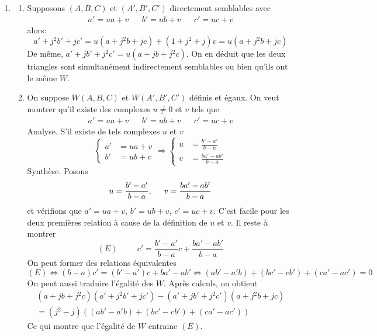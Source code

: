 \begin{enumerate}
 \item 
\begin{enumerate}
 \item Supposons $(A,B,C)$ et $(A',B',C')$ directement semblables avec
\begin{align*}
 a' = ua+v & & b'=ub+v & & c'=uc+v
\end{align*}
alors:
\begin{displaymath}
 a'+j^2b'+jc' = u(a+j^2b+jc) + (1+j^2+j)v = u(a+j^2b+jc)
\end{displaymath}
De même, $a'+jb'+j^2c' = u(a+jb+j^2c)$. On en déduit que les deux triangles sont simultanément indirectement semblables ou bien qu'ils ont le même $W$.
 \item On suppose $W(A,B,C)$ et $W(A',B',C')$ définis et égaux. On veut montrer qu'il existe des complexes $u\neq 0$ et $v$ tels que
\begin{align*}
 a' = ua+v & & b'=ub+v & & c'=uc+v
\end{align*}
Analyse. S'il existe de tels complexes $u$ et $v$
\begin{displaymath}
 \left\lbrace 
\begin{aligned}
 a' &= ua +v\\b' &= ub+v
\end{aligned}
\right. 
\Rightarrow
 \left\lbrace 
\begin{aligned}
 u &= \frac{b'-a'}{b-a}\\ v &= \frac{ba'-ab'}{b-a}
\end{aligned}
\right. 
\end{displaymath}
 Synthèse. Posons
\begin{displaymath}
 u = \frac{b'-a'}{b-a}, \hspace{0.5cm} v = \frac{ba'-ab'}{b-a}
\end{displaymath}
et vérifions que $a'=ua+v$, $b'=ub+v$, $c'=uc+v$. C'est facile pour les deux premières relation à cause de la définition de $u$ et $v$. Il reste à montrer
\begin{displaymath}
 (E)\hspace{1cm} c' = \frac{b'-a'}{b-a}c + \frac{ba'-ab'}{b-a}
\end{displaymath}
On peut former des relations équivalentes
\begin{displaymath}
 (E)\Leftrightarrow (b-a)c'=(b'-a')c+ba'-ab'
\Leftrightarrow (ab'-a'b) + (bc'-cb') + (ca'-ac') = 0
\end{displaymath}
On peut aussi traduire l'égalité des $W$. Après calculs, on obtient
\begin{multline*}
 (a+jb+j^2c)(a'+j^2b'+jc')-(a'+jb'+j^2c')(a+j^2b+jc) \\
= (j^2-j)\left( (ab'-a'b) + (bc'-cb') + (ca'-ac')\right) 
\end{multline*}
Ce qui montre que l'égalité de $W$ entraine $(E)$.
\end{enumerate}


\end{enumerate}
